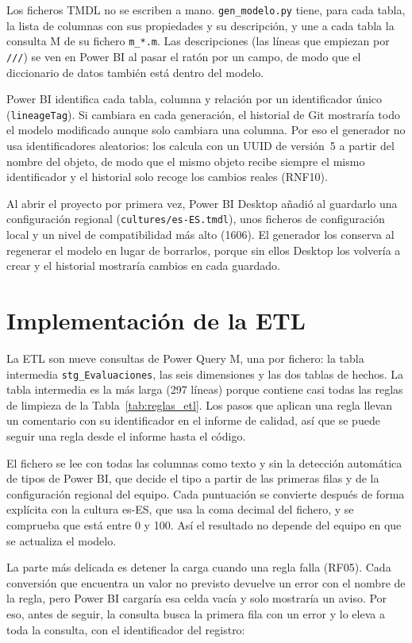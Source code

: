\documentclass[12pt, a4paper, oneside]{report}
\begin{document}
Los ficheros TMDL no se escriben a mano. \texttt{gen\_modelo.py} tiene, para cada tabla, la lista de columnas con sus propiedades y su descripción, y une a cada tabla la consulta M de su fichero \texttt{m\_*.m}. Las descripciones (las líneas que empiezan por \texttt{///}) se ven en Power BI al pasar el ratón por un campo, de modo que el diccionario de datos también está dentro del modelo.

Power BI identifica cada tabla, columna y relación por un identificador único (\texttt{lineageTag}). Si cambiara en cada generación, el historial de Git mostraría todo el modelo modificado aunque solo cambiara una columna. Por eso el generador no usa identificadores aleatorios: los calcula con un UUID de versión~5 a partir del nombre del objeto, de modo que el mismo objeto recibe siempre el mismo identificador y el historial solo recoge los cambios reales (RNF10).

Al abrir el proyecto por primera vez, Power BI Desktop añadió al guardarlo una configuración regional (\texttt{cultures/es-ES.tmdl}), unos ficheros de configuración local y un nivel de compatibilidad más alto (1606). El generador los conserva al regenerar el modelo en lugar de borrarlos, porque sin ellos Desktop los volvería a crear y el historial mostraría cambios en cada guardado.

\section{Implementación de la ETL}
\label{sec:impl_etl}
La ETL son nueve consultas de Power Query M, una por fichero: la tabla intermedia \texttt{stg\_Evaluaciones}, las seis dimensiones y las dos tablas de hechos. La tabla intermedia es la más larga (297 líneas) porque contiene casi todas las reglas de limpieza de la Tabla~\ref{tab:reglas_etl}. Los pasos que aplican una regla llevan un comentario con su identificador en el informe de calidad, así que se puede seguir una regla desde el informe hasta el código.

El fichero se lee con todas las columnas como texto y sin la detección automática de tipos de Power BI, que decide el tipo a partir de las primeras filas y de la configuración regional del equipo. Cada puntuación se convierte después de forma explícita con la cultura es-ES, que usa la coma decimal del fichero, y se comprueba que está entre 0 y 100. Así el resultado no depende del equipo en que se actualiza el modelo.

La parte más delicada es detener la carga cuando una regla falla (RF05). Cada conversión que encuentra un valor no previsto devuelve un error con el nombre de la regla, pero Power BI cargaría esa celda vacía y solo mostraría un aviso. Por eso, antes de seguir, la consulta busca la primera fila con un error y lo eleva a toda la consulta, con el identificador del registro:
\end{document}
